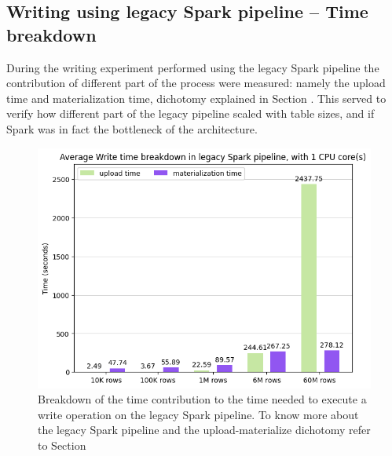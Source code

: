 \subsection{Writing using legacy Spark pipeline -- Time breakdown}

During the writing experiment performed using the legacy Spark pipeline the contribution of different part of the process were measured: namely the upload time and materialization time, dichotomy explained in Section . This served to verify how different part of the legacy pipeline scaled with table sizes, and if Spark was in fact the bottleneck of the architecture.

\begin{figure}[!ht]
    \centering
    \includegraphics[width=\textwidth]{figures/5-results/diagram_hudi_virtualiz_1_core.png}
    \caption{Breakdown of the time contribution to the time needed to execute a write operation on the legacy Spark pipeline. To know more about the legacy Spark pipeline and the upload-materialize dichotomy refer to Section }
    \label{fig:hudi_virtualiz_breakdown}
\end{figure}